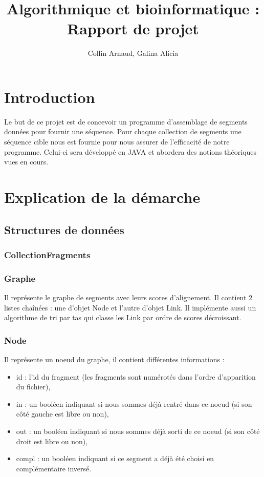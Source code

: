 \documentclass{article}
\begin{document}
\title{Algorithmique et bioinformatique : Rapport de projet}
\author{Collin Arnaud, Galina Alicia}
\maketitle
\newpage
\tableofcontents
\newpage
\section{Introduction}
Le but de ce projet est de concevoir un programme d'assemblage de segments données pour fournir une séquence. Pour chaque collection de segments une séquence cible nous est fournie pour nous assurer de l'efficacité de notre programme. Celui-ci sera développé en JAVA et abordera des notions théoriques vues en cours.

\section{Explication de la démarche}

\subsection{Structures de données}
\subsubsection{CollectionFragments}

\subsubsection{Graphe}
Il représente le graphe de segments avec leurs scores d'alignement. Il contient 2 listes chaînées : une d'objet Node et l'autre d'objet Link. Il implémente aussi un algorithme de tri par tas qui classe les Link par ordre de scores décroissant.
\subsubsection{Node}
Il représente un noeud du graphe, il contient différentes informations :
\begin{itemize}
\item id : l'id du fragment (les fragments sont numérotés dans l'ordre d'apparition du fichier),
\item in : un booléen indiquant si nous sommes déjà rentré dans ce noeud (si son côté gauche est libre ou non),
\item out : un booléen indiquant si nous sommes déjà sorti de ce noeud (si son côté droit est libre ou non),
\item compl : un booléen indiquant si ce segment a déjà été choisi en complémentaire inversé.
\end{itemize}
\end{document}
